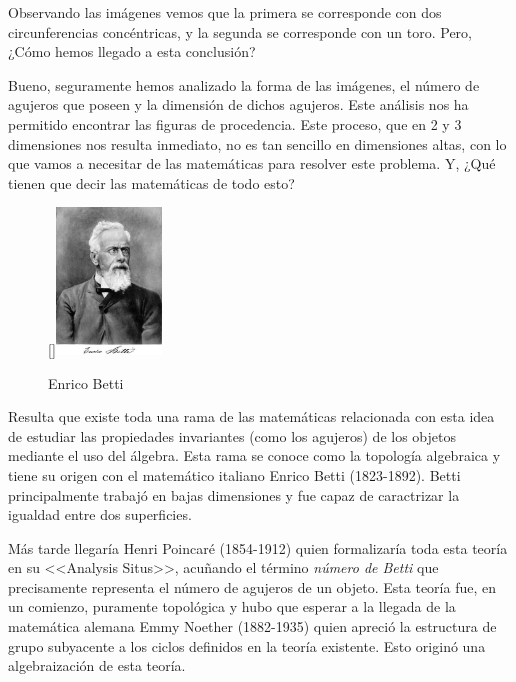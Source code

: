 \documentclass[12pt, a4paper, twoside]{book}
\numberwithin{equation}{section}
\theoremstyle{definition}
\theoremstyle{remark}
\theoremstyle{plain}
\begin{document}
	Observando las imágenes vemos que la primera se corresponde con dos 
	circunferencias concéntricas, y la segunda se corresponde con un toro. 
	Pero, ¿Cómo hemos llegado a esta conclusión? 

	Bueno, seguramente hemos
	analizado la forma de las imágenes, el número de agujeros que poseen y 
	la dimensión de dichos agujeros. Este análisis nos ha permitido 
	encontrar las figuras de procedencia. Este proceso, que en 2 y 3 
	dimensiones nos resulta inmediato, no es tan sencillo en dimensiones 
	altas, con lo que vamos a necesitar de las matemáticas para resolver 
	este problema. Y, ¿Qué tienen que decir las matemáticas de todo esto?	
	
	\begin{figure}
	  \begin{center}
		  \raisebox{16pt}[\dimexpr{}\baselineskip\relax]{\includegraphics[width=0.25\textwidth]{Images/344px-Betti_Enrico.jpg}}
	  \vspace*{-9mm}
	  \caption*{Enrico Betti}
	  \end{center}
	\end{figure}
	
	Resulta que existe toda una rama de las matemáticas relacionada con 
	esta idea de estudiar las propiedades invariantes (como los agujeros) 
	de los objetos mediante el uso del álgebra. Esta rama se conoce como 
	la topología algebraica y tiene su origen con el matemático italiano 
	Enrico Betti (1823-1892). Betti principalmente trabajó en bajas 
	dimensiones y fue capaz de caractrizar la igualdad entre dos 
	superficies.

	Más tarde llegaría Henri Poincaré (1854-1912) quien formalizaría toda 
	esta teoría en su <<Analysis Situs>>, acuñando el término 
	\emph{número de Betti} que precisamente representa el número de 
	agujeros de un objeto. Esta teoría fue, en un comienzo, puramente 
	topológica y hubo que esperar a la llegada de la matemática alemana 
	Emmy Noether (1882-1935) quien apreció la estructura de grupo 
	subyacente a los ciclos definidos en la teoría existente. Esto originó 
	una algebraización de esta teoría.
\end{document}
